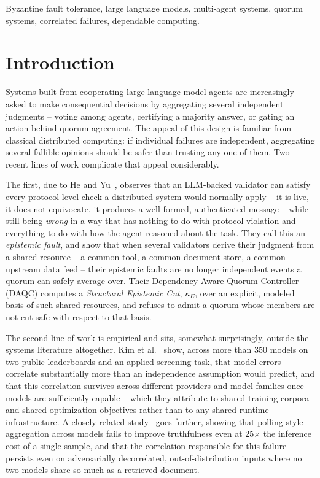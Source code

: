 \documentclass[journal]{IEEEtran}
\begin{document}
\begin{IEEEkeywords}
Byzantine fault tolerance, large language models, multi-agent systems, quorum systems, correlated failures, dependable computing.
\end{IEEEkeywords}

\section{Introduction}

Systems built from cooperating large-language-model agents are increasingly asked to make consequential decisions by aggregating several independent judgments -- voting among agents, certifying a majority answer, or gating an action behind quorum agreement. The appeal of this design is familiar from classical distributed computing: if individual failures are independent, aggregating several fallible opinions should be safer than trusting any one of them. Two recent lines of work complicate that appeal considerably.

The first, due to He and Yu~\cite{he2026honest,he2026illusion}, observes that an LLM-backed validator can satisfy every protocol-level check a distributed system would normally apply -- it is live, it does not equivocate, it produces a well-formed, authenticated message -- while still being \emph{wrong} in a way that has nothing to do with protocol violation and everything to do with how the agent reasoned about the task. They call this an \emph{epistemic fault}, and show that when several validators derive their judgment from a shared resource -- a common tool, a common document store, a common upstream data feed -- their epistemic faults are no longer independent events a quorum can safely average over. Their Dependency-Aware Quorum Controller (DAQC) computes a \emph{Structural Epistemic Cut}, $\kappa_E$, over an explicit, modeled basis of such shared resources, and refuses to admit a quorum whose members are not cut-safe with respect to that basis.

The second line of work is empirical and sits, somewhat surprisingly, outside the systems literature altogether. Kim et al.~\cite{kim2025correlated} show, across more than 350 models on two public leaderboards and an applied screening task, that model errors correlate substantially more than an independence assumption would predict, and that this correlation survives across different providers and model families once models are sufficiently capable -- which they attribute to shared training corpora and shared optimization objectives rather than to any shared runtime infrastructure. A closely related study~\cite{consensus2026} goes further, showing that polling-style aggregation across models fails to improve truthfulness even at 25$\times$ the inference cost of a single sample, and that the correlation responsible for this failure persists even on adversarially decorrelated, out-of-distribution inputs where no two models share so much as a retrieved document.
\end{document}
